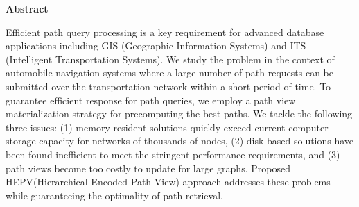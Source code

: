 \begin{center}
{\Large \bf Abstract}
\end{center}
\vspace{5mm}

\justifying
\hspace{1cm}
	Efficient path query processing is a key requirement for advanced database applications including GIS (Geographic Information Systems) and ITS (Intelligent Transportation Systems). We study the problem in the context of automobile navigation systems where a large number of path requests can be submitted over the transportation network within a short period of time. To guarantee efficient response for path queries, we employ a path view materialization strategy for precomputing the best paths. We tackle the following three issues: (1) memory-resident solutions quickly exceed current computer storage capacity for networks of thousands of nodes, (2) disk based solutions have been found inefficient to meet the stringent performance requirements, and (3) path views become too costly to update for large graphs. Proposed HEPV(Hierarchical Encoded Path View) approach addresses these problems while guaranteeing the optimality of path retrieval.

